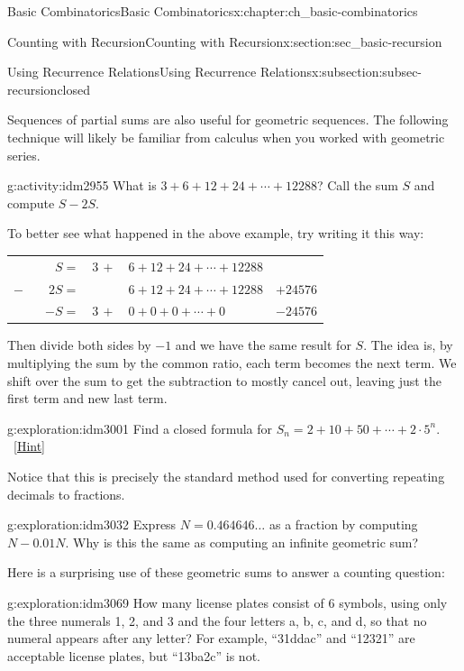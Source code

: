 \documentclass[oneside,10pt,]{book}
\numberwithin{equation}{chapter}
\newcommand{\hrulethin}  {\noalign{\hrule height 0.04em}}
\begin{document}
\begin{chapterptx}{Basic Combinatorics}{}{Basic Combinatorics}{}{}{x:chapter:ch_basic-combinatorics}
\begin{sectionptx}{Counting with Recursion}{}{Counting with Recursion}{}{}{x:section:sec_basic-recursion}
\begin{subsectionptx}{Using Recurrence Relations}{}{Using Recurrence Relations}{}{}{x:subsection:subsec-recursionclosed}
\par
Sequences of partial sums are also useful for geometric sequences.  The following technique will likely be familiar from calculus when you worked with geometric series.%
\begin{activity}{}{g:activity:idm2955}%
What is \(3 + 6 + 12 + 24 + \cdots + 12288\)?  Call the sum \(S\) and compute \(S - 2S\).%
\end{activity}
To better see what happened in the above example, try writing it this way:%
\begin{sidebyside}{1}{0}{0}{0}%
\begin{sbspanel}{1}%
{\centering%
\begin{tabular}{rlll}
\(S=\)&\(3 \, +\)&\(6 + 12 + 24 + \cdots + 12288\)&\tabularnewline[0pt]
\(- \qquad 2S=\)&&\(6 + 12 + 24 + \cdots + 12288\)&\(+ 24576\)\tabularnewline\hrulethin
\(-S = \)&\(3 \, +\)&\(0 + 0 + 0 +  \cdots + 0 \)&\(-24576\)
\end{tabular}
\par}
\end{sbspanel}%
\end{sidebyside}%
\par
Then divide both sides by \(-1\) and we have the same result for \(S\). The idea is, by multiplying the sum by the common ratio, each term becomes the next term. We shift over the sum to get the subtraction to mostly cancel out, leaving just the first term and new last term.%
\begin{exploration}{}{g:exploration:idm3001}%
Find a closed formula for \(S_n = 2 + 10 + 50 + \cdots + 2\cdot 5^n\).%
\qquad~\hfill{\tiny\hyperlink{g:hint:idm3005-back}{[Hint]}}\end{exploration}
Notice that this is precisely the standard method used for converting repeating decimals to fractions.%
\begin{exploration}{}{g:exploration:idm3032}%
Express \(N = 0.464646\ldots\) as a fraction by computing \(N - 0.01N\).  Why is this the same as computing an infinite geometric sum?%
\end{exploration}
Here is a surprising use of these geometric sums to answer a counting question:%
\begin{exploration}{}{g:exploration:idm3069}%
How many license plates consist of 6 symbols, using only the three numerals 1, 2, and 3 and the four letters a, b, c, and d, so that no numeral appears after any letter?  For example, ``31ddac'' and ``12321'' are acceptable license plates, but ``13ba2c'' is not.%
\begin{enumerate}[font=\bfseries,label=(\alph*),ref=\alph*]

\end{enumerate}
\end{exploration}
\end{subsectionptx}
\end{sectionptx}
\end{chapterptx}
\end{document}
